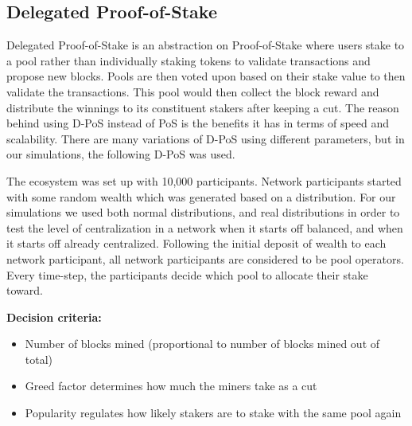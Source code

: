 \subsection{Delegated Proof-of-Stake}
Delegated Proof-of-Stake is an abstraction on Proof-of-Stake where users stake to a pool rather than individually staking tokens to validate transactions and propose new blocks. Pools are then voted upon based on their stake value to then validate the transactions. This pool would then collect the block reward and distribute the winnings to its constituent stakers after keeping a cut. The reason behind using D-PoS instead of PoS is the benefits it has in terms of speed and scalability. There are many variations of D-PoS using different parameters, but in our simulations, the following D-PoS was used.

The ecosystem was set up with 10,000 participants. Network participants started with some random wealth which was generated based on a distribution. For our simulations we used both normal distributions, and real distributions in order to test the level of centralization in a network when it starts off balanced, and when it starts off already centralized. Following the initial deposit of wealth to each network participant, all network participants are considered to be pool operators. Every time-step, the participants decide which pool to allocate their stake toward.

\textbf{Decision criteria:}
\begin{itemize}
\item Number of blocks mined (proportional to number of blocks mined out of total)
\item Greed factor determines how much the miners take as a cut
\item Popularity regulates how likely stakers are to stake with the same pool again
\end{itemize}

